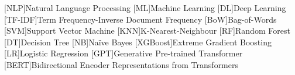 [NLP]{Natural Language Processing}
[ML]{Machine Learning}
[DL]{Deep Learning}
[TF-IDF]{Term Frequency-Inverse Document Frequency}
[BoW]{Bag-of-Words}
[SVM]{Support Vector Machine}
[KNN]{K-Nearest-Neighbour}
[RF]{Random Forest}
[DT]{Decision Tree}
[NB]{Naïve Bayes}
[XGBoost]{Extreme Gradient Boosting}
[LR]{Logistic Regression}
[GPT]{Generative Pre-trained Transformer}
[BERT]{Bidirectional Encoder Representations from Transformers}

